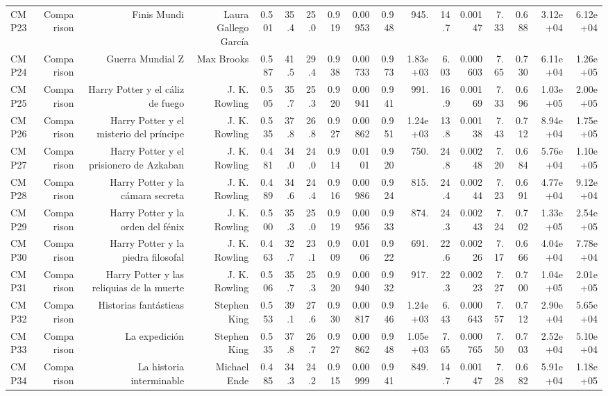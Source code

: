 \begin{table}[htbp]
\begin{tabular}{lrrrrrrrrrrrrrrrr}
CMP23 & Comparison & Finis Mundi & Laura Gallego García & 0.501 & 35.4 & 25.0 & 0.919 & 0.00953 & 0.948 & 945. & 14.7 & 0.00147 & 7.33 & 0.688 & 3.12e+04 & 6.12e+04 \\
CMP24 & Comparison & Guerra Mundial Z & Max Brooks & 0.587 & 41.5 & 29.4 & 0.938 & 0.00733 & 0.973 & 1.83e+03 & 6.03 & 0.000603 & 7.65 & 0.730 & 6.11e+04 & 1.26e+05 \\
CMP25 & Comparison & Harry Potter y el cáliz de fuego & J. K. Rowling & 0.505 & 35.7 & 25.3 & 0.920 & 0.00941 & 0.941 & 991. & 16.9 & 0.00169 & 7.33 & 0.696 & 1.03e+05 & 2.00e+05 \\
CMP26 & Comparison & Harry Potter y el misterio del príncipe & J. K. Rowling & 0.535 & 37.8 & 26.8 & 0.927 & 0.00862 & 0.951 & 1.24e+03 & 13.8 & 0.00138 & 7.43 & 0.712 & 8.94e+04 & 1.75e+05 \\
CMP27 & Comparison & Harry Potter y el prisionero de Azkaban & J. K. Rowling & 0.481 & 34.0 & 24.0 & 0.914 & 0.0101 & 0.920 & 750. & 24.8 & 0.00248 & 7.20 & 0.684 & 5.76e+04 & 1.10e+05 \\
CMP28 & Comparison & Harry Potter y la cámara secreta & J. K. Rowling & 0.489 & 34.6 & 24.4 & 0.916 & 0.00986 & 0.924 & 815. & 24.4 & 0.00244 & 7.23 & 0.691 & 4.77e+04 & 9.12e+04 \\
CMP29 & Comparison & Harry Potter y la orden del fénix & J. K. Rowling & 0.500 & 35.3 & 25.0 & 0.919 & 0.00956 & 0.933 & 874. & 24.3 & 0.00243 & 7.24 & 0.702 & 1.33e+05 & 2.54e+05 \\
CMP30 & Comparison & Harry Potter y la piedra filosofal & J. K. Rowling & 0.463 & 32.7 & 23.1 & 0.909 & 0.0106 & 0.922 & 691. & 22.6 & 0.00226 & 7.17 & 0.666 & 4.04e+04 & 7.78e+04 \\
CMP31 & Comparison & Harry Potter y las reliquias de la muerte & J. K. Rowling & 0.506 & 35.7 & 25.3 & 0.920 & 0.00940 & 0.932 & 917. & 22.3 & 0.00223 & 7.27 & 0.700 & 1.04e+05 & 2.01e+05 \\
CMP32 & Comparison & Historias fantásticas & Stephen King & 0.553 & 39.1 & 27.6 & 0.930 & 0.00817 & 0.946 & 1.24e+03 & 6.43 & 0.000643 & 7.57 & 0.712 & 2.90e+04 & 5.65e+04 \\
CMP33 & Comparison & La expedición & Stephen King & 0.535 & 37.8 & 26.7 & 0.927 & 0.00862 & 0.948 & 1.05e+03 & 7.65 & 0.000765 & 7.50 & 0.703 & 2.52e+04 & 5.10e+04 \\
CMP34 & Comparison & La historia interminable & Michael Ende & 0.485 & 34.3 & 24.2 & 0.915 & 0.00999 & 0.941 & 849. & 14.7 & 0.00147 & 7.28 & 0.682 & 5.91e+04 & 1.18e+05 \\

\end{tabular}
\end{table}
